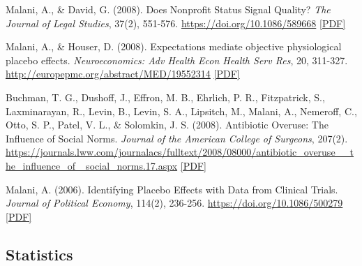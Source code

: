 \begin{tablist}
        \item[2008] \tab{}Malani, A., \& David, G. (2008). Does Nonprofit Status Signal Quality? \textit{The Journal of Legal Studies}, 37(2), 551-576. \href{https://doi.org/10.1086/589668}{https://doi.org/10.1086/589668} \href{https://github.com/anup-malani/website_personal/blob/main/publications/2008_Malani_JLS_NonProfitSignalQuality.pdf}{[PDF]} 
        
        \item[2008] \tab{}Malani, A., \& Houser, D. (2008). Expectations mediate objective physiological placebo effects. \textit{Neuroeconomics: Adv Health Econ Health Serv Res}, 20, 311-327. \href{http://europepmc.org/abstract/MED/19552314}{http://europepmc.org/abstract/MED/19552314}  \href{https://github.com/anup-malani/website_personal/blob/main/publications/2008_Malani_Neuroecon_CaffeinePlacebo.pdf}{[PDF]} 

        \item[2008] \tab{}Buchman, T. G., Dushoff, J., Effron, M. B., Ehrlich, P. R., Fitzpatrick, S., Laxminarayan, R., Levin, B., Levin, S. A., Lipsitch, M., Malani, A., Nemeroff, C., Otto, S. P., Patel, V. L., \& Solomkin, J. S. (2008). Antibiotic Overuse: The Influence of Social Norms. \textit{Journal of the American College of Surgeons}, 207(2). \href{https://journals.lww.com/journalacs/fulltext/2008/08000/antibiotic_overuse__the_influence_of_social_norms.17.aspx}{https://journals.lww.com/journalacs/fulltext/2008/08000/antibiotic\_overuse\_\_the\_influence\_of\_ social\_norms.17.aspx}   \href{https://github.com/anup-malani/website_personal/blob/main/publications/2008_BuchmanMalani_AbxOveruse.pdf}{[PDF]} 
        
        \item[2006] \tab{}Malani, A. (2006). Identifying Placebo Effects with Data from Clinical Trials. \textit{Journal of Political Economy}, 114(2), 236-256. \href{https://doi.org/10.1086/500279}{https://doi.org/10.1086/500279} \href{https://github.com/anup-malani/website_personal/blob/main/publications/2006_Malani_JPE_PlaceboEffects.pdf}{[PDF]}
        
    \end{tablist}
    
    \subsection*{Statistics}

